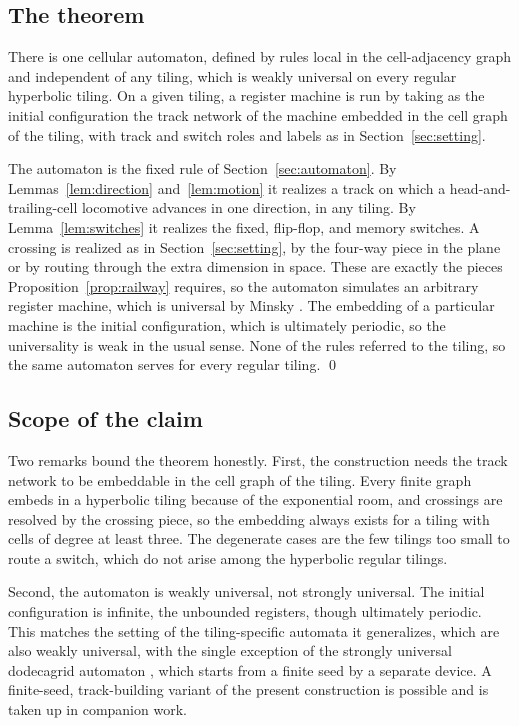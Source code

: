 \subsection{The theorem}

\begin{theorem}
\label{thm:main}
There is one cellular automaton, defined by rules local in the cell-adjacency graph and independent of any
tiling, which is weakly universal on every regular hyperbolic tiling. On a given tiling, a register machine is
run by taking as the initial configuration the track network of the machine embedded in the cell graph of the
tiling, with track and switch roles and labels as in Section~\ref{sec:setting}.
\end{theorem}

The automaton is the fixed rule of Section~\ref{sec:automaton}. By Lemmas~\ref{lem:direction}
and~\ref{lem:motion} it realizes a track on which a head-and-trailing-cell locomotive advances in one
direction, in any tiling. By Lemma~\ref{lem:switches} it realizes the fixed, flip-flop, and memory switches. A
crossing is realized as in Section~\ref{sec:setting}, by the four-way piece in the plane or by routing through
the extra dimension in space. These are exactly the pieces Proposition~\ref{prop:railway} requires, so the
automaton simulates an arbitrary register machine, which is universal by Minsky \cite{minsky1967}. The
embedding of a particular machine is the initial configuration, which is ultimately periodic, so the
universality is weak in the usual sense. None of the rules referred to the tiling, so the same automaton serves
for every regular tiling. \qed

\subsection{Scope of the claim}

Two remarks bound the theorem honestly. First, the construction needs the track network to be embeddable in
the cell graph of the tiling. Every finite graph embeds in a hyperbolic tiling because of the exponential room,
and crossings are resolved by the crossing piece, so the embedding always exists for a tiling with cells of
degree at least three. The degenerate cases are the few tilings too small to route a switch, which do not arise
among the hyperbolic regular tilings.

Second, the automaton is weakly universal, not strongly universal. The initial configuration is infinite, the
unbounded registers, though ultimately periodic. This matches the setting of the tiling-specific automata it
generalizes, which are also weakly universal, with the single exception of the strongly universal dodecagrid
automaton \cite{margenstern2021dodeca5}, which starts from a finite seed by a separate device. A
finite-seed, track-building variant of the present construction is possible and is taken up in companion work.
